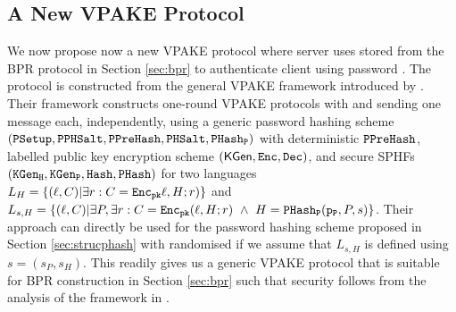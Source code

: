\subsection{A New VPAKE Protocol} \label{sec:vpake}
We now propose now a new \ac{VPAKE} protocol where server \Server uses \ver stored from the \ac{BPR} protocol in Section \ref{sec:bpr} to authenticate client \Client using password \pwd. 
The protocol is constructed from the general \ac{VPAKE} framework introduced by \citet{BenhamoudaP13}. 
Their framework constructs one-round \ac{VPAKE} protocols with \Client and \Server sending one message each, independently, using a generic password hashing scheme $(\mathtt{PSetup}, \mathtt{PPHSalt}, \mathtt{PPreHash},\mathtt{PHSalt}, \mathtt{PHash_P})$ with deterministic $\mathtt{PPreHash}$, labelled public key encryption scheme $(\mathsf{KGen}, \mathtt{Enc}, \mathtt{Dec})$, and secure \acp{SPHF} $(\mathtt{KGen_H}, \mathtt{KGen_P}, \mathtt{Hash}, \mathtt{PHash})$ for two languages $L_H = \{(\ell, C) | \exists r : C = \mathtt{Enc}_\mathtt{pk}\ell, H; r)\}$ and $L_{s,H}  = \{(\ell, C) | \exists P, \exists r : C = \mathtt{Enc}_\mathtt{pk}(\ell, H; r)\ \wedge\ H = \mathtt{PHash_P}(\mathtt{p_P},\allowbreak P, s)\}$. 
Their approach can directly be used for the password hashing scheme proposed in Section \ref{sec:strucphash} with randomised \PPreHash if we assume that $L_{s,H}$ is defined using $s=(s_P,s_H)$. 
This readily gives us a generic \ac{VPAKE} protocol that is suitable for \ac{BPR} construction in Section \ref{sec:bpr} such that security follows from the analysis of the framework in \cite{BenhamoudaP13}.


